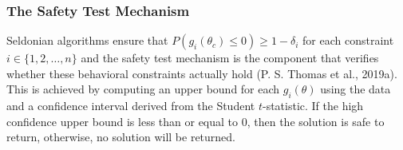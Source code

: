 \documentclass[12pt, twoside]{amherstthesis}
\begin{document}
\hypertarget{safety}{%
\subsubsection{The Safety Test Mechanism}\label{safety}}

Seldonian algorithms ensure that \(P(g_i(\theta_c) \leq 0) \geq 1 - \delta_i\) for each constraint \(i \in \{ 1,2, \ldots, n \}\) and the safety test mechanism is the component that verifies whether these behavioral constraints actually hold (P. S. Thomas et al., 2019a). This is achieved by computing an upper bound for each \(g_i(\theta)\) using the data and a confidence interval derived from the Student \(t\)-statistic. If the high confidence upper bound is less than or equal to 0, then the solution is safe to return, otherwise, no solution will be returned.
\end{document}
